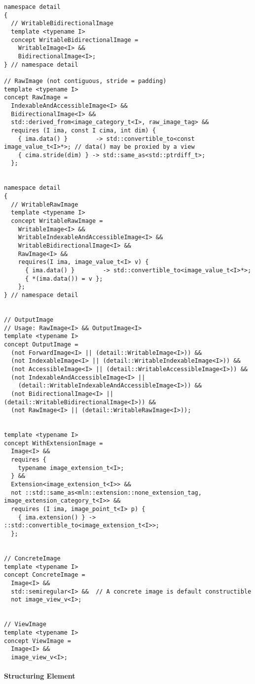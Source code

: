\begin{verbatim}
namespace detail
{
  // WritableBidirectionalImage
  template <typename I>
  concept WritableBidirectionalImage =
    WritableImage<I> &&
    BidirectionalImage<I>;
} // namespace detail

// RawImage (not contiguous, stride = padding)
template <typename I>
concept RawImage =
  IndexableAndAccessibleImage<I> &&
  BidirectionalImage<I> &&
  std::derived_from<image_category_t<I>, raw_image_tag> &&
  requires (I ima, const I cima, int dim) {
    { ima.data() }        -> std::convertible_to<const image_value_t<I>*>; // data() may be proxied by a view
    { cima.stride(dim) } -> std::same_as<std::ptrdiff_t>;
  };


namespace detail
{
  // WritableRawImage
  template <typename I>
  concept WritableRawImage =
    WritableImage<I> &&
    WritableIndexableAndAccessibleImage<I> &&
    WritableBidirectionalImage<I> &&
    RawImage<I> &&
    requires(I ima, image_value_t<I> v) {
      { ima.data() }        -> std::convertible_to<image_value_t<I>*>;
      { *(ima.data()) = v };
    };
} // namespace detail


// OutputImage
// Usage: RawImage<I> && OutputImage<I>
template <typename I>
concept OutputImage =
  (not ForwardImage<I> || (detail::WritableImage<I>)) &&
  (not IndexableImage<I> || (detail::WritableIndexableImage<I>)) &&
  (not AccessibleImage<I> || (detail::WritableAccessibleImage<I>)) &&
  (not IndexableAndAccessibleImage<I> ||
    (detail::WritableIndexableAndAccessibleImage<I>)) &&
  (not BidirectionalImage<I> || (detail::WritableBidirectionalImage<I>)) &&
  (not RawImage<I> || (detail::WritableRawImage<I>));


template <typename I>
concept WithExtensionImage =
  Image<I> &&
  requires {
    typename image_extension_t<I>;
  } &&
  Extension<image_extension_t<I>> &&
  not ::std::same_as<mln::extension::none_extension_tag, image_extension_category_t<I>> &&
  requires (I ima, image_point_t<I> p) {
    { ima.extension() } -> ::std::convertible_to<image_extension_t<I>>;
  };


// ConcreteImage
template <typename I>
concept ConcreteImage =
  Image<I> &&
  std::semiregular<I> &&  // A concrete image is default constructible
  not image_view_v<I>;


// ViewImage
template <typename I>
concept ViewImage =
  Image<I> &&
  image_view_v<I>;
\end{verbatim}


\paragraph{Structuring Element}

